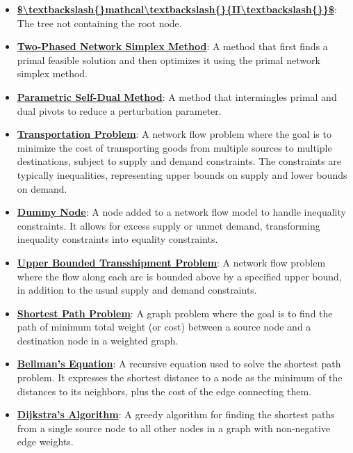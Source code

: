 \documentclass{article}%
\begin{document}
\begin{itemize}[leftmargin=*]
\item \href{https://www.math.purdue.edu/~yipn/421/2024-11-07-NetSimplex.pdf#page=14}{\textbf{\$\textbackslash{}textbackslash\{\}mathcal\textbackslash{}textbackslash\{\}\{II\textbackslash{}textbackslash\{\}\}\$}}: The tree not containing the root node.%
\item \href{https://www.math.purdue.edu/~yipn/421/2024-11-07-NetSimplex.pdf#page=45}{\textbf{Two{-}Phased Network Simplex Method}}: A method that first finds a primal feasible solution and then optimizes it using the primal network simplex method.%
\item \href{https://www.math.purdue.edu/~yipn/421/2024-11-07-NetSimplex.pdf#page=45}{\textbf{Parametric Self{-}Dual Method}}: A method that intermingles primal and dual pivots to reduce a perturbation parameter.%
\end{itemize}%
\begin{itemize}[leftmargin=*]%
\item \href{https://www.math.purdue.edu/~yipn/421/2024-11-14-NetAppls.pdf#page=1}{\textbf{Transportation Problem}}: A network flow problem where the goal is to minimize the cost of transporting goods from multiple sources to multiple destinations, subject to supply and demand constraints. The constraints are typically inequalities, representing upper bounds on supply and lower bounds on demand.%
\item \href{https://www.math.purdue.edu/~yipn/421/2024-11-14-NetAppls.pdf#page=3}{\textbf{Dummy Node}}: A node added to a network flow model to handle inequality constraints. It allows for excess supply or unmet demand, transforming inequality constraints into equality constraints.%
\item \href{https://www.math.purdue.edu/~yipn/421/2024-11-14-NetAppls.pdf#page=9}{\textbf{Upper Bounded Transshipment Problem}}: A network flow problem where the flow along each arc is bounded above by a specified upper bound, in addition to the usual supply and demand constraints.%
\item \href{https://www.math.purdue.edu/~yipn/421/2024-11-14-NetAppls.pdf#page=13}{\textbf{Shortest Path Problem}}: A graph problem where the goal is to find the path of minimum total weight (or cost) between a source node and a destination node in a weighted graph.%
\item \href{https://www.math.purdue.edu/~yipn/421/2024-11-14-NetAppls.pdf#page=16}{\textbf{Bellman's Equation}}: A recursive equation used to solve the shortest path problem. It expresses the shortest distance to a node as the minimum of the distances to its neighbors, plus the cost of the edge connecting them.%
\item \href{https://www.math.purdue.edu/~yipn/421/2024-11-14-NetAppls.pdf#page=20}{\textbf{Dijkstra's Algorithm}}: A greedy algorithm for finding the shortest paths from a single source node to all other nodes in a graph with non-negative edge weights.%
\end{itemize}%
\end{document}
